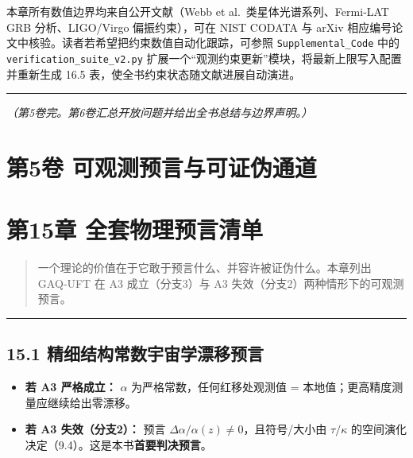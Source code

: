 本章所有数值边界均来自公开文献（Webb et al.~类星体光谱系列、Fermi‑LAT
GRB 分析、LIGO/Virgo 偏振约束），可在 NIST CODATA 与 arXiv
相应编号论文中核验。读者若希望把约束数值自动化跟踪，可参照
\texttt{Supplemental\_Code} 中的 \texttt{verification\_suite\_v2.py}
扩展一个``观测约束更新''模块，将最新上限写入配置并重新生成 16.5
表，使全书约束状态随文献进展自动演进。

\begin{center}\rule{0.5\linewidth}{0.5pt}\end{center}

\emph{（第5卷完。第6卷汇总开放问题并给出全书总结与边界声明。）}

\section{第5卷
可观测预言与可证伪通道}\label{ux7b2c5ux5377-ux53efux89c2ux6d4bux9884ux8a00ux4e0eux53efux8bc1ux4f2aux901aux9053}

\section{第15章
全套物理预言清单}\label{ux7b2c15ux7ae0-ux5168ux5957ux7269ux7406ux9884ux8a00ux6e05ux5355-1}

\begin{quote}
一个理论的价值在于它敢于预言什么、并容许被证伪什么。本章列出 GAQ‑UFT 在
A3 成立（分支3）与 A3 失效（分支2）两种情形下的可观测预言。
\end{quote}

\begin{center}\rule{0.5\linewidth}{0.5pt}\end{center}

\subsection{15.1
精细结构常数宇宙学漂移预言}\label{ux7cbeux7ec6ux7ed3ux6784ux5e38ux6570ux5b87ux5b99ux5b66ux6f02ux79fbux9884ux8a00}

\begin{itemize}
\tightlist
\item
  \textbf{若 A3 严格成立：} \(\alpha\) 为严格常数，任何红移处观测值 =
  本地值；更高精度测量应继续给出零漂移。
\item
  \textbf{若 A3 失效（分支2）：} 预言
  \(\Delta\alpha/\alpha(z)\neq0\)，且符号/大小由 \(\tau/\kappa\)
  的空间演化决定（9.4）。这是本书\textbf{首要判决预言}。
\end{itemize}

